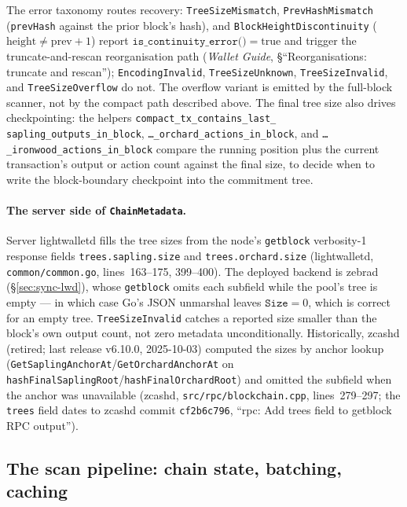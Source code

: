 \documentclass[11pt,a4paper]{article}
\theoremstyle{definition}
\begin{document}
The error taxonomy routes recovery: \texttt{TreeSizeMismatch},
\texttt{PrevHashMismatch} (\texttt{prevHash} against the prior block's
hash), and \texttt{BlockHeightDiscontinuity} ($\mathrm{height} \neq
\mathrm{prev}+1$) report $\texttt{is\_continuity\_error()} = \mathrm{true}$
and trigger the truncate-and-rescan reorganisation path (\emph{Wallet
Guide}, \S``Reorganisations: truncate and rescan'');
\texttt{EncodingInvalid}, \texttt{TreeSizeUnknown},
\texttt{TreeSizeInvalid}, and \texttt{TreeSizeOverflow} do not.
The overflow variant is emitted by the full-block
scanner, not by the compact path described above. The final tree size also
drives checkpointing: the
helpers \texttt{compact\_tx\_}\allowbreak\texttt{contains\_last\_}\allowbreak%
\texttt{sapling\_outputs\_in\_block},
\texttt{\ldots\_orchard\_}\allowbreak\texttt{actions\_in\_block}, and
\texttt{\ldots\_ironwood\_}\allowbreak\texttt{actions\_in\_block}
compare the running position plus the current transaction's output or
action count against the final size, to decide when to write the
block-boundary checkpoint into the commitment tree.

\paragraph{The server side of \texttt{ChainMetadata}.}
Server \textsf{lightwalletd} fills the tree sizes from the node's
\texttt{getblock} verbosity-1 response fields \texttt{trees.sapling.size}
and \texttt{trees.orchard.size} (\textsf{lightwalletd},
\texttt{common/common.go}, lines~163--175, 399--400). The deployed
backend is zebrad (\S\ref{sec:sync-lwd}), whose \texttt{getblock} omits
each subfield while the pool's tree is empty --- in which case Go's JSON
unmarshal
leaves $\texttt{Size} = 0$, which is correct for an empty tree.
\texttt{TreeSizeInvalid} catches a reported size smaller than the
block's own output count, not zero metadata unconditionally.
Historically, \textsf{zcashd}
(retired; last release v6.10.0, 2025-10-03) computed the sizes by anchor
lookup
(\texttt{GetSaplingAnchorAt}/\allowbreak\texttt{GetOrchardAnchorAt} on
\texttt{hashFinalSaplingRoot}/\allowbreak\texttt{hashFinalOrchardRoot})
and omitted the subfield when the anchor was unavailable
(\textsf{zcashd}, \texttt{src/rpc/blockchain.cpp}, lines~279--297; the
\texttt{trees} field dates to \textsf{zcashd} commit \texttt{cf2b6c796},
``rpc: Add trees field to getblock RPC output'').

\subsection{The scan pipeline: chain state, batching, caching}%
\label{sec:sync-compact-pipeline}
\end{document}

